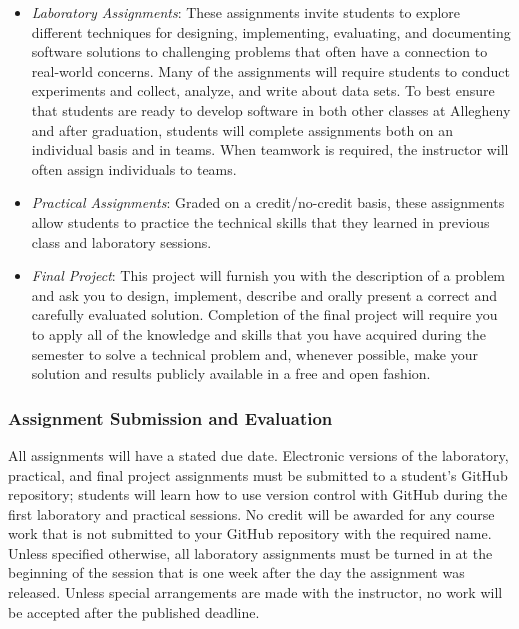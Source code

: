 \documentclass[11pt]{article}
\begin{document}
\begin{itemize}
  \item {\em Laboratory Assignments\/}: These assignments invite students to
    explore different techniques for designing, implementing, evaluating, and
    documenting software solutions to challenging problems that often have a
    connection to real-world concerns. Many of the assignments will require
    students to conduct experiments and collect, analyze, and write about data
    sets. To best ensure that students are ready to develop software in both
    other classes at Allegheny and after graduation, students will complete
    assignments both on an individual basis and in teams. When teamwork is
    required, the instructor will often assign individuals to teams.

  \item {\em Practical Assignments\/}: Graded on a credit/no-credit basis, these
    assignments allow students to practice the technical skills that they
    learned in previous class and laboratory sessions.

  \item {\em Final Project\/}: This project will furnish you with the
    description of a problem and ask you to design, implement, describe and
    orally present a correct and carefully evaluated solution. Completion of the
    final project will require you to apply all of the knowledge and skills that
    you have acquired during the semester to solve a technical problem and,
    whenever possible, make your solution and results publicly available in a
    free and open fashion.

\end{itemize}

\subsubsection*{Assignment Submission and Evaluation}

All assignments will have a stated due date. Electronic versions of the
laboratory, practical, and final project assignments must be submitted to a
student's GitHub repository; students will learn how to use version control with
GitHub during the first laboratory and practical sessions. No credit will be
awarded for any course work that is not submitted to your GitHub repository with
the required name. Unless specified otherwise, all laboratory assignments must
be turned in at the beginning of the session that is one week after the day the
assignment was released. Unless special arrangements are made with the
instructor, no work will be accepted after the published deadline.
\end{document}
